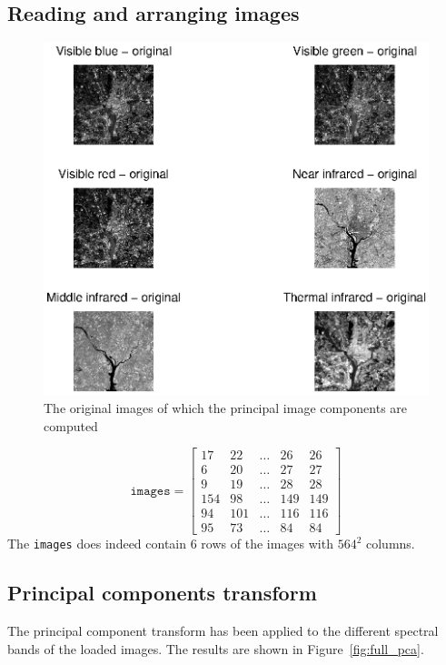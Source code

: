\subsection{Reading and arranging images}
\begin{figure}[htb]
 \centering
 \includegraphics[width=\linewidth]{original_pca.eps}
 \caption{The original images of which the principal image components are computed}
 \label{fig:original_pca}
\end{figure}
\[
\texttt{images} = \begin{bmatrix}
	17  & 22  & \ldots & 26  & 26   \\[0.3em]
	6   & 20  & \ldots & 27  & 27   \\[0.3em]
	9   & 19  & \ldots & 28  & 28   \\[0.3em]
	154 & 98  & \ldots & 149 & 149  \\[0.3em]     
	94  & 101 & \ldots & 116 & 116  \\[0.3em]
	95  & 73  & \ldots & 84  & 84  
\end{bmatrix}
\]
The \texttt{images} does indeed contain 6 rows of the images with \(564^2\) columns.
\clearpage

\subsection{Principal components transform}
The principal component transform has been applied to the different spectral bands of the loaded images.
The results are shown in Figure~\ref{fig:full_pca}.

